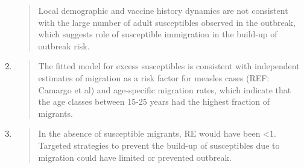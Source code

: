 \begin{enumerate}
\begin{quote}
  Local demographic and vaccine history dynamics are not consistent with
  the large number of adult susceptibles observed in the outbreak, which
  suggests role of susceptible immigration in the build-up of outbreak
  risk.
  \end{quote}
\item
  \begin{quote}
  The fitted model for excess susceptibles is consistent with
  independent estimates of migration as a risk factor for measles cases
  (REF: Camargo et al) and age-specific migration rates, which indicate
  that the age classes between 15-25 years had the highest fraction of
  migrants.
  \end{quote}
\item
  \begin{quote}
  In the absence of susceptible migrants, RE would have been
  \textless{}1. Targeted strategies to prevent the build-up of
  susceptibles due to migration could have limited or prevented
  outbreak.
  \end{quote}
\end{enumerate}